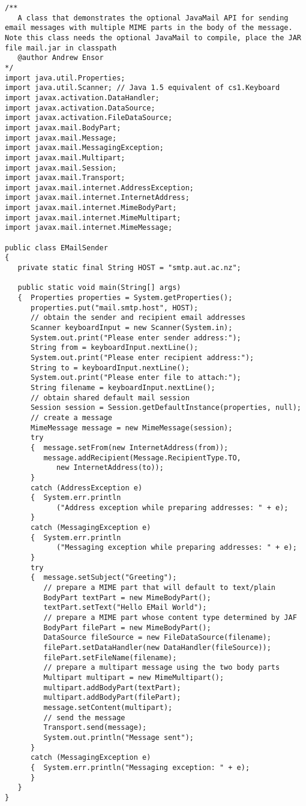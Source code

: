 \begin{lstlisting}[caption=JavaMail API]
/**
   A class that demonstrates the optional JavaMail API for sending email messages with multiple MIME parts in the body of the message. Note this class needs the optional JavaMail to compile, place the JAR file mail.jar in classpath
   @author Andrew Ensor
*/
import java.util.Properties;
import java.util.Scanner; // Java 1.5 equivalent of cs1.Keyboard
import javax.activation.DataHandler;
import javax.activation.DataSource;
import javax.activation.FileDataSource;
import javax.mail.BodyPart;
import javax.mail.Message;
import javax.mail.MessagingException;
import javax.mail.Multipart;
import javax.mail.Session;
import javax.mail.Transport;
import javax.mail.internet.AddressException;
import javax.mail.internet.InternetAddress;
import javax.mail.internet.MimeBodyPart;
import javax.mail.internet.MimeMultipart;
import javax.mail.internet.MimeMessage;

public class EMailSender
{
   private static final String HOST = "smtp.aut.ac.nz";

   public static void main(String[] args)
   {  Properties properties = System.getProperties();
      properties.put("mail.smtp.host", HOST);
      // obtain the sender and recipient email addresses
      Scanner keyboardInput = new Scanner(System.in);
      System.out.print("Please enter sender address:");
      String from = keyboardInput.nextLine();
      System.out.print("Please enter recipient address:");
      String to = keyboardInput.nextLine();
      System.out.print("Please enter file to attach:");
      String filename = keyboardInput.nextLine();
      // obtain shared default mail session
      Session session = Session.getDefaultInstance(properties, null);
      // create a message
      MimeMessage message = new MimeMessage(session);
      try
      {  message.setFrom(new InternetAddress(from));
         message.addRecipient(Message.RecipientType.TO,
            new InternetAddress(to));
      }
      catch (AddressException e)
      {  System.err.println
            ("Address exception while preparing addresses: " + e);
      }
      catch (MessagingException e)
      {  System.err.println
            ("Messaging exception while preparing addresses: " + e);
      }
      try
      {  message.setSubject("Greeting");
         // prepare a MIME part that will default to text/plain
         BodyPart textPart = new MimeBodyPart();
         textPart.setText("Hello EMail World");
         // prepare a MIME part whose content type determined by JAF
         BodyPart filePart = new MimeBodyPart();
         DataSource fileSource = new FileDataSource(filename);
         filePart.setDataHandler(new DataHandler(fileSource));
         filePart.setFileName(filename);
         // prepare a multipart message using the two body parts
         Multipart multipart = new MimeMultipart();
         multipart.addBodyPart(textPart);
         multipart.addBodyPart(filePart);
         message.setContent(multipart);
         // send the message
         Transport.send(message);
         System.out.println("Message sent");
      }
      catch (MessagingException e)
      {  System.err.println("Messaging exception: " + e);
      }
   }
}
\end{lstlisting}

